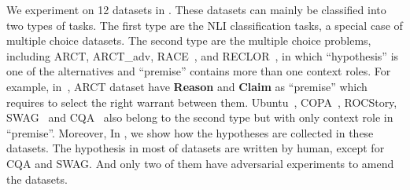  We experiment on 12 datasets in . 
These datasets can mainly be classified into two types of tasks. 
The first type are the NLI classification tasks, a special case of multiple choice datasets. 
The second type are the multiple choice problems, including ARCT, 
ARCT\_adv\cite{schuster2019towards}, 
RACE~\cite{lai2017race}, and RECLOR~\cite{yu2020reclor}, in which ``hypothesis'' 
is one of the alternatives and ``premise'' contains more than one context roles. 
For example, in~, 
ARCT dataset have \textbf{Reason} and \textbf{Claim} as ``premise'' 
which requires to select the right warrant between them. 
Ubuntu~\cite{lowe2015ubuntu}, COPA~\cite{roemmele2011choice}, ROCStory, SWAG~\cite{zellers2018swag} and 
CQA~\cite{talmor2019commonsenseqa} also belong to the second type but with only context role 
in ``premise''.
Moreover, In , we 
show how the hypotheses are collected in these datasets. The hypothesis 
in most of datasets are written by human, except for CQA and SWAG. And only two of
them have adversarial experiments to amend the datasets.    
 

